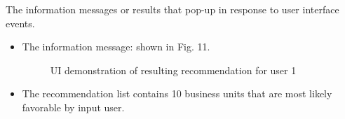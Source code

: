 \begin{itemize}
\begin{itemize}
	 \end{itemize}
\item{}
	The information messages or results that pop-up in response to user interface events.
	\begin{itemize} 
	\item{The information message: shown in Fig. 11.}
	\begin{figure}[h] 
	\begin{center}
		\advance\rightskip-1cm
		{}
		\caption{UI demonstration of resulting recommendation for user 1}\label{fig:UI_Result}
	\end{center}
	\end{figure}
	\item{}
	The recommendation list contains 10 business units that are most likely favorable by input user. 
	 \end{itemize}


